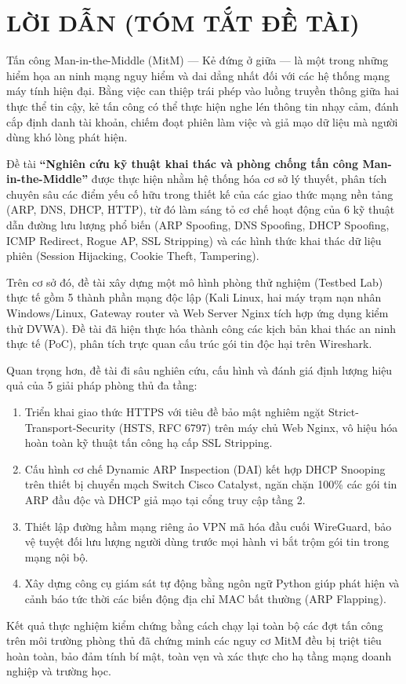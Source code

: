 \chapter*{LỜI DẪN (TÓM TẮT ĐỀ TÀI)}

Tấn công Man-in-the-Middle (MitM) --- Kẻ đứng ở giữa --- là một trong những hiểm họa an ninh mạng nguy hiểm và dai dẳng nhất đối với các hệ thống mạng máy tính hiện đại. Bằng việc can thiệp trái phép vào luồng truyền thông giữa hai thực thể tin cậy, kẻ tấn công có thể thực hiện nghe lén thông tin nhạy cảm, đánh cắp định danh tài khoản, chiếm đoạt phiên làm việc và giả mạo dữ liệu mà người dùng khó lòng phát hiện.

Đề tài \textbf{``Nghiên cứu kỹ thuật khai thác và phòng chống tấn công Man-in-the-Middle''} được thực hiện nhằm hệ thống hóa cơ sở lý thuyết, phân tích chuyên sâu các điểm yếu cố hữu trong thiết kế của các giao thức mạng nền tảng (ARP, DNS, DHCP, HTTP), từ đó làm sáng tỏ cơ chế hoạt động của 6 kỹ thuật dẫn đường lưu lượng phổ biến (ARP Spoofing, DNS Spoofing, DHCP Spoofing, ICMP Redirect, Rogue AP, SSL Stripping) và các hình thức khai thác dữ liệu phiên (Session Hijacking, Cookie Theft, Tampering).

Trên cơ sở đó, đề tài xây dựng một mô hình phòng thử nghiệm (Testbed Lab) thực tế gồm 5 thành phần mạng độc lập (Kali Linux, hai máy trạm nạn nhân Windows/Linux, Gateway router và Web Server Nginx tích hợp ứng dụng kiểm thử DVWA). Đề tài đã hiện thực hóa thành công các kịch bản khai thác an ninh thực tế (PoC), phân tích trực quan cấu trúc gói tin độc hại trên Wireshark.

Quan trọng hơn, đề tài đi sâu nghiên cứu, cấu hình và đánh giá định lượng hiệu quả của 5 giải pháp phòng thủ đa tầng:
\begin{enumerate}
  \item Triển khai giao thức HTTPS với tiêu đề bảo mật nghiêm ngặt Strict-Transport-Security (HSTS, RFC 6797) trên máy chủ Web Nginx, vô hiệu hóa hoàn toàn kỹ thuật tấn công hạ cấp SSL Stripping.
  \item Cấu hình cơ chế Dynamic ARP Inspection (DAI) kết hợp DHCP Snooping trên thiết bị chuyển mạch Switch Cisco Catalyst, ngăn chặn 100\% các gói tin ARP đầu độc và DHCP giả mạo tại cổng truy cập tầng 2.
  \item Thiết lập đường hầm mạng riêng ảo VPN mã hóa đầu cuối WireGuard, bảo vệ tuyệt đối lưu lượng người dùng trước mọi hành vi bắt trộm gói tin trong mạng nội bộ.
  \item Xây dựng công cụ giám sát tự động bằng ngôn ngữ Python giúp phát hiện và cảnh báo tức thời các biến động địa chỉ MAC bất thường (ARP Flapping).
\end{enumerate}

Kết quả thực nghiệm kiểm chứng bằng cách chạy lại toàn bộ các đợt tấn công trên môi trường phòng thủ đã chứng minh các nguy cơ MitM đều bị triệt tiêu hoàn toàn, bảo đảm tính bí mật, toàn vẹn và xác thực cho hạ tầng mạng doanh nghiệp và trường học.
